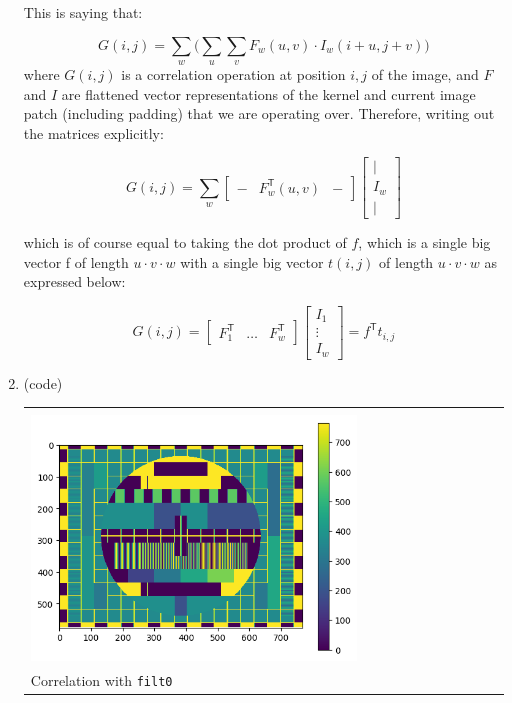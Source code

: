 \documentclass{article}
\begin{document}
\begin{enumerate}[label=(\roman*)]
This is saying that:

\begin{equation}
G(i,j) = \sum_{w} \Bigg( \sum_{u}\sum_{v} F_w(u,v) \cdot I_w(i+u,j+v) \Bigg)
\end{equation}
where $G(i,j)$ is a correlation operation at position $i,j$ of the image, and $F$ and $I$ are flattened vector representations of the kernel and current image patch (including padding) that we are operating over. Therefore, writing out the matrices explicitly:

\begin{equation}
G(i,j) = \sum_w
\begin{bmatrix}- & F_w^\mathsf{T}(u,v) & -\end{bmatrix}
\begin{bmatrix}| \\ I_w \\ |\end{bmatrix}
\end{equation}

which is of course equal to taking the dot product of $f$, which is a single big vector f of length $u\cdot v\cdot w$ with a single big vector $t(i,j)$ of length $u\cdot v\cdot w$ as expressed below:

\begin{equation}
G(i,j) = 
\begin{bmatrix}F_1^\mathsf{T} & \hdots & F_w^\mathsf{T}\end{bmatrix}
\begin{bmatrix}I_{1} \\ \vdots \\ I_{w}\end{bmatrix}
= f^\mathsf{T} t_{i,j}
\end{equation}

\item %
(code)
\begin{tabular}[t]{l}
	\hline \\
	\includegraphics[width=0.7\textwidth]{img/corr_img_filt0.png} \\
	\hline
	Correlation with \texttt{filt0} \\
\end{tabular}


\end{enumerate}
\end{document}
